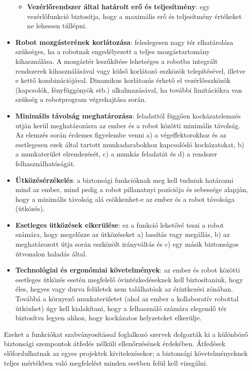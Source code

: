 \documentclass[../documentation.tex]{subfiles}
\begin{document}
\begin{itemize}
\begin{itemize}
		\item \textbf{Vezérlőrendszer által határolt erő és teljesítmény}: egy vezérlőfunkció biztosítja, hogy a maximális erő és teljesítmény értékeket ne lehessen túllépni.
	\end{itemize}
	\item \textbf{Robot mozgásterének korlátozása}: feleslegesen nagy tér elhatárolása szükséges, ha a robotnak engedélyezett a teljes mozgástartomány kihasználása. A mozgástér leszűkítése lehetséges a robotba integrált rendszerek kihasználásával vagy külső korlátozó eszközök telepítésével, illetve e kettő kombinációjával. Dinamikus korlátozás érhető el vezérlőeszközök (kapcsolók, fényfüggönyök stb.) alkalmazásával, ha további limitációkra van szükség a robotprogram végrehajtása során.
	\item \textbf{Minimális távolság meghatározása}: feladattól függően kockázatelemzés utján kerül meghatározásra az ember és a robot közötti minimális távolság. Az elemzés során érdemes figyelembe venni a) a végeffektorokhoz és az esetlegesen ezek által tartott munkadarabokhoz kapcsolódó kockázatokat, b) a munkaterület elrendezését, c) a munkás feladatát és d) a rendszer felhasználhatóságát.
	\item \textbf{Ütközésérzékelés}: a biztonsági funkcióknak meg kell tudniuk határozni mind az ember, mind pedig a robot pillanatnyi pozíciója és sebessége alapján, hogy a minimális távolság alá csökkenhet-e az ember és a robot távolsága (ütközés).
	\item \textbf{Esetleges ütközések elkerülése}: ez a funkció lehetővé teszi a robot számára, hogy megelőzze az ütközéseket a) lassítás vagy megállás, b) az meghatározott útja során eszközölt irányváltás és c) egy másik biztonságos útvonalon haladás által.
	\item \textbf{Technológiai és ergonómiai követelmények}: az ember és robot közötti esetleges ütközés esetén megfelelő óvintézkedéseknek kell biztosítaniuk, hogy éles, hegyes vagy durva felületek nem találhatóak az érintkezési zónában. Továbbá a környező munkaterületet (ahol az ember a kollaboratív robottal ütközhet) úgy kell kialakítani, hogy a felhasználó számára elegendő tér biztosítva legyen ahhoz, hogy kockázatos helyzeteket elkerülje.
\end{itemize}

Ezeket a funkciókat szabványosítással foglalkozó szervek dolgozták ki a különböző biztonsági szempontok átfedés nélküli ellenőrzésének érdekében. Átfedések előfordulhatnak az egyes projektek kivitelezésekor; a biztonsági követelményeknek teljes mértékben való megfelelést minden esetben felül kell vizsgálni.
\end{document}
